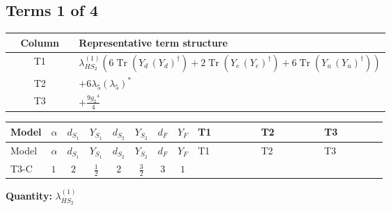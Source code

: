 \documentclass[8pt]{article}
\begin{document}
\begin{landscape}
\subsection*{Terms 1 of 4}
\begin{center}
\begin{tabular}{@{}c >{\raggedright\arraybackslash}p{0.82\linewidth}@{}}
\toprule
Column & Representative term structure \\
\midrule
T1 & \(\displaystyle {\lambda_{HS_2}^{(1)}} (6 \operatorname{Tr}\!\left({Y_d}\,\left({Y_d}\right)^{\dagger}\right)+2 \operatorname{Tr}\!\left({Y_e}\,\left({Y_e}\right)^{\dagger}\right)+6 \operatorname{Tr}\!\left({Y_u}\,\left({Y_u}\right)^{\dagger}\right))\) \\
\midrule
T2 & \(\displaystyle +6 {\lambda_5} \left({\lambda_5}\right)^{*}\) \\
\midrule
T3 & \(\displaystyle +\frac{9 {g_2}^4}{4}\) \\
\midrule
\bottomrule
\end{tabular}
\end{center}
\smallskip
\tiny
\begin{longtable}{@{}llcccccc >{\raggedright\arraybackslash}p{0.21\linewidth} >{\raggedright\arraybackslash}p{0.21\linewidth} >{\raggedright\arraybackslash}p{0.21\linewidth}@{}}
\toprule
Model & $\alpha$ & $d_{S_1}$ & $Y_{S_1}$ & $d_{S_2}$ & $Y_{S_2}$ & $d_F$ & $Y_F$ & T1 & T2 & T3 \\
\midrule
\endfirsthead
\toprule
Model & $\alpha$ & $d_{S_1}$ & $Y_{S_1}$ & $d_{S_2}$ & $Y_{S_2}$ & $d_F$ & $Y_F$ & T1 & T2 & T3 \\
\midrule
\endhead
T3-C & $1$ & $2$ & $\frac{1}{2}$ & $2$ & $\frac{3}{2}$ & $3$ & $1$ & \scriptsize\adjustbox{max width=\linewidth}{$\begin{gathered} {\lambda_{HS_2}^{(1)}} (6 \operatorname{Tr}\!\left({Y_d}\,\left({Y_d}\right)^{\dagger}\right)+2 \operatorname{Tr}\!\left({Y_e}\,\left({Y_e}\right)^{\dagger}\right)+6 \operatorname{Tr}\!\left({Y_u}\,\left({Y_u}\right)^{\dagger}\right))\end{gathered}$} & \scriptsize\adjustbox{max width=\linewidth}{$\begin{gathered} +6 {\lambda_5} \left({\lambda_5}\right)^{*}\end{gathered}$} & \scriptsize\adjustbox{max width=\linewidth}{$\begin{gathered} +\frac{9 {g_2}^4}{4}\end{gathered}$} \\
\midrule
\bottomrule
\end{longtable}
\clearpage
\noindent\textbf{Quantity: }$\lambda_{HS_2}^{(1)}$\par\smallskip

\end{landscape}
\end{document}
